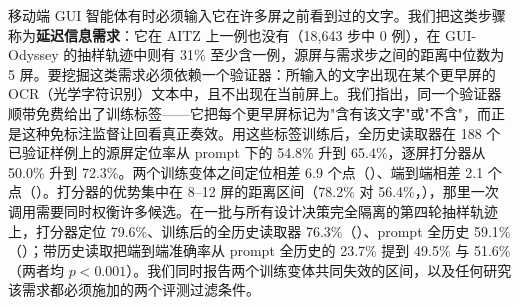 移动端 GUI 智能体有时必须输入它在许多屏之前看到过的文字。我们把这类步骤称为\textbf{延迟信息需求}：它在 AITZ 上一例也没有（18,643 步中 0 例），在 GUI-Odyssey 的抽样轨迹中则有 31\% 至少含一例，源屏与需求步之间的距离中位数为 5 屏。要挖掘这类需求必须依赖一个验证器：所输入的文字出现在某个更早屏的 OCR（光学字符识别）文本中，且不出现在当前屏上。我们指出，同一个验证器顺带免费给出了训练标签——它把每个更早屏标记为"含有该文字"或"不含"，而正是这种免标注监督让回看真正奏效。用这些标签训练后，全历史读取器在 188 个已验证样例上的源屏定位率从 prompt 下的 54.8\% 升到 65.4\%，逐屏打分器从 50.0\% 升到 72.3\%。两个训练变体之间定位相差 6.9 个点（）、端到端相差 2.1 个点（）。打分器的优势集中在 8--12 屏的距离区间（78.2\% 对 56.4\%，），那里一次调用需要同时权衡许多候选。在一批与所有设计决策完全隔离的第四轮抽样轨迹上，打分器定位 79.6\%、训练后的全历史读取器 76.3\%（）、prompt 全历史 59.1\%（）；带历史读取把端到端准确率从 prompt 全历史的 23.7\% 提到 49.5\% 与 51.6\%（两者均 $p<0.001$）。我们同时报告两个训练变体共同失效的区间，以及任何研究该需求都必须施加的两个评测过滤条件。
